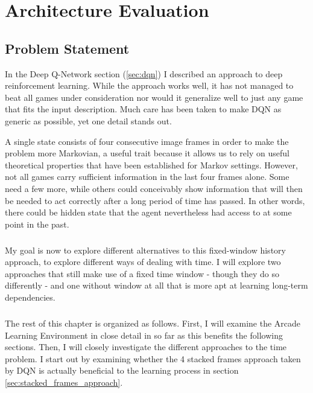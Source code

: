 \chapter{Architecture Evaluation}
\label{chap:experiments}

\section{Problem Statement}
\label{sec:problem_statement}

In the Deep Q-Network section (\ref{sec:dqn})
I described an approach to deep reinforcement learning.
While the approach works well,
it has not managed to beat all games under consideration
nor would it generalize well to just any game
that fits the input description.
Much care has been taken to make DQN as generic as possible,
yet one detail stands out.

A single state consists of four consecutive image frames
in order to make the problem more Markovian,
a useful trait because it allows us to rely on
useful theoretical properties that have been established
for Markov settings.
However, not all games carry sufficient information
in the last four frames alone.
Some need a few more,
while others could conceivably
show information
that will then be needed to act correctly
after a long period of time has passed.
In other words, there could be hidden state
that the agent nevertheless had access to
at some point in the past.

\paragraph{}
My goal is now to explore different alternatives
to this fixed-window history approach,
to explore different ways of dealing with time.
I will explore two approaches
that still make use of a fixed time window
- though they do so differently -
and one without window at all
that is more apt at learning long-term dependencies.

\paragraph{}
The rest of this chapter is organized as follows.
First, I will examine the Arcade Learning Environment
in close detail in so far as this benefits
the following sections.
Then, I will closely investigate
the different approaches
to the time problem.
I start out by examining
whether the 4 stacked frames approach taken by DQN
is actually beneficial to the learning process
in section \ref{sec:stacked_frames_approach}.

